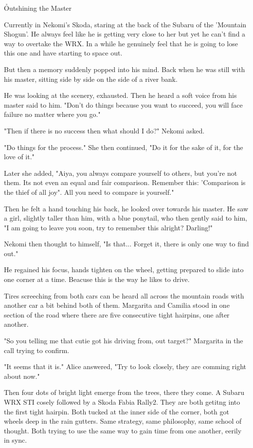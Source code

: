 \h{Outshining the Master}

Currently in Nekomi's Skoda, staring at the back of the Subaru of the 'Mountain Shogun'. He always feel like he is getting very close to her but yet he can't find a way to overtake the WRX. In a while he genuinely feel that he is going to lose this one and have starting to space out.

But then a memory suddenly popped into his mind. Back when he was still with his master, sitting side by side on the side of a river bank.

He was looking at the scenery, exhausted. Then he heard a soft voice from his master said to him. "Don't do things because you want to succeed, you will face failure no matter where you go."

"Then if there is no success then what should I do?" Nekomi asked.

"Do things for the process." She then continued, "Do it for the sake of it, for the love of it."

Later she added, "Aiya, you always compare yourself to others, but you're not them. Its not even an equal and fair comparison. Remember this: 'Comparison is the thief of all joy". All you need to compare is yourself."

Then he felt a hand touching his back, he looked over towards his master. He saw a girl, slightly taller than him, with a blue ponytail, who then gently said to him, "I am going to leave you soon, try to remember this alright? Darling!"

Nekomi then thought to himself, "Is that... Forget it, there is only one way to find out."

He regained his focus, hands tighten on the wheel, getting prepared to slide into one corner at a time. Beacuse this is the way he likes to drive.

Tires screeching from both cars can be heard all across the mountain roads with another car a bit behind both of them. Margarita and Camilia stood in one section of the road where there are five consecutive tight hairpins, one after another.

"So you telling me that cutie got his driving from, out target?" Margarita in the call trying to confirm.

"It seems that it is." Alice answered, "Try to look closely, they are comming right about now."

Then four dots of bright light emerge from the trees, there they come. A Subaru WRX STI cosely followed by a Skoda Fabia Rally2. They are both getitng into the first tight hairpin. Both tucked at the inner side of the corner, both got wheels deep in the rain gutters. Same strategy, same philosophy, same school of thought. Both trying to use the same way to gain time from one another, eerily in sync.

